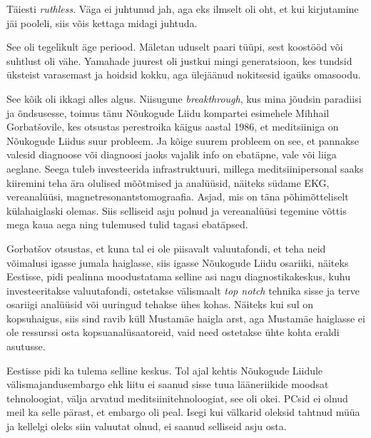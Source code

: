 
Täiesti \emph{ruthless}. Väga ei juhtunud jah, aga eks ilmselt oli oht, et kui 
kirjutamine jäi pooleli, siis võis kettaga midagi juhtuda. 

See oli tegelikult äge periood. Mäletan uduselt paari tüüpi, sest
koostööd või suhtlust oli vähe. Yamahade juurest oli justkui mingi 
generatsioon, kes tundsid üksteist varasemast ja hoidsid 
kokku, aga ülejäänud nokitsesid igaüks omasoodu. 

See kõik oli ikkagi alles algus. Niisugune \emph{breakthrough}, kus 
mina jõudsin paradiisi ja õndsusesse, toimus tänu Nõukogude Liidu kompartei esimehele Mihhail Gorbatšovile, kes otsustas 
perestroika käigus aastal 1986, et meditsiiniga on Nõukogude 
Liidus suur probleem. Ja kõige suurem probleem 
on see, et pannakse valesid diagnoose või diagnoosi jaoks vajalik info on 
ebatäpne, vale või liiga aeglane. Seega tuleb investeerida infrastruktuuri, 
millega meditsiinipersonal saaks kiiremini teha ära olulised mõõtmised ja 
analüüsid, näiteks südame EKG, vereanalüüsi, 
magnetresonantstomograafia. Asjad, mis on täna põhimõtteliselt 
külahaiglaski olemas. Siis selliseid asju polnud ja vereanalüüsi tegemine võttis mega 
kaua aega ning tulemused tulid tagasi ebatäpsed. 

Gorbatšov otsustas, et kuna tal ei ole piisavalt valuutafondi, et teha neid 
võimalusi igasse jumala haiglasse, siis igasse Nõukogude Liidu osariiki, 
näiteks Eestisse, pidi pealinna moodustatama selline asi nagu 
diagnostikakeskus, kuhu investeeritakse valuutafondi, ostetakse välismaalt 
\emph{top notch} tehnika sisse ja terve osariigi analüüsid või uuringud 
tehakse ühes kohas. Näiteks kui sul on kopsuhaigus, siis sind ravib küll
Mustamäe haigla arst, aga Mustamäe haiglasse ei ole ressurssi 
osta kopsuanalüsaatoreid, vaid need ostetakse ühte kohta 
eraldi asutusse.

Eestisse pidi ka tulema selline keskus. Tol ajal kehtis Nõukogude Liidule välismajandusembargo ehk 
liitu ei saanud sisse tuua lääneriikide moodsat tehnoloogiat, välja arvatud
meditsiinitehnoloogiat, see oli okei. PCsid ei olnud meil ka selle pärast, et embargo oli peal. Isegi kui välkarid oleksid tahtnud müüa ja
kellelgi oleks siin valuutat olnud, ei saanud selliseid asju osta. 

